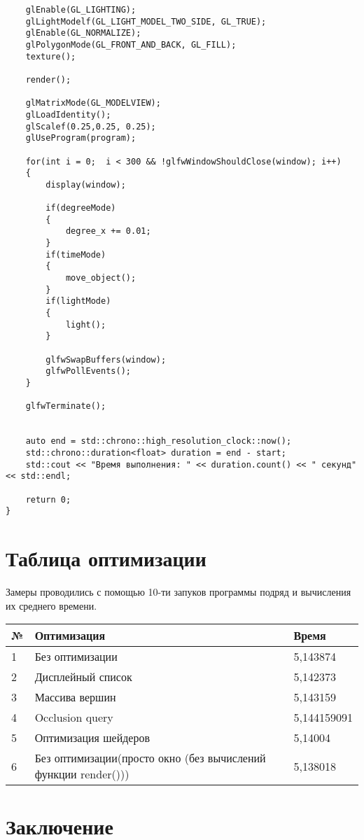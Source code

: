 \documentclass[a4paper, 14pt]{extarticle}
\begin{document}
\begin{verbatim}
    glEnable(GL_LIGHTING);
    glLightModelf(GL_LIGHT_MODEL_TWO_SIDE, GL_TRUE);
    glEnable(GL_NORMALIZE);
    glPolygonMode(GL_FRONT_AND_BACK, GL_FILL);
    texture();

    render();
    
    glMatrixMode(GL_MODELVIEW);
    glLoadIdentity();
    glScalef(0.25,0.25, 0.25);
    glUseProgram(program);

    for(int i = 0;  i < 300 && !glfwWindowShouldClose(window); i++)
    {
        display(window);

        if(degreeMode)
        {
            degree_x += 0.01;
        }
        if(timeMode)
        {
            move_object();
        }
        if(lightMode)
        {
            light();
        }

        glfwSwapBuffers(window);
        glfwPollEvents();
    }

    glfwTerminate();


    auto end = std::chrono::high_resolution_clock::now();
    std::chrono::duration<float> duration = end - start;
    std::cout << "Время выполнения: " << duration.count() << " секунд" << std::endl;

    return 0;
}    
\end{verbatim}

\section{Таблица оптимизации}

Замеры проводились с помощью 10-ти запуков программы подряд и вычисления их среднего времени.

\begin{tabular}
{|p{1cm}|p{10cm}|p{5cm}|}
\hline
№ & Оптимизация & Время \\
\hline
1 & Без оптимизации & 5,143874 \\
\hline
2 & Дисплейный список & 5,142373 \\
\hline
3 & Массива вершин & 5,143159 \\
\hline
4 & Occlusion query & 5,144159091 \\
\hline
5 & Оптимизация шейдеров & 5,14004 \\
\hline
6 & Без оптимизации(просто окно (без вычислений функции render())) & 5,138018 \\
\hline
\end{tabular}

\section{Заключение}
\end{document}
